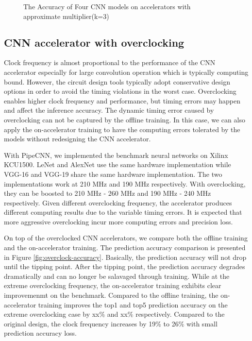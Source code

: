 \begin{figure}
        \center
        \qquad
        \caption{The Accuracy of Four CNN models on accelerators with approximate multiplier(k=3)}
        \label{fig:k3-approximate-mltiplier}
\end{figure}

\subsection{CNN accelerator with overclocking}
Clock frequency is almost proportional to the performance of the CNN accelerator 
especially for large convolution operation which is typically computing bound. 
However, the circuit design tools typically adopt conservative design options 
in order to avoid the timing violations in the worst case. Overclocking enables 
higher clock frequency and performance, but timing errors may happen and affect 
the inference accuracy. The dynamic timing error caused by overclocking 
can not be captured by the offline training. In this case, we can also apply the on-accelerator 
training to have the computing errors tolerated by the models without 
redesigning the CNN accelerator.

With PipeCNN, we implemented the benchmark neural networks on Xilinx KCU1500. 
LeNet and AlexNet use the same hardware implementation 
while VGG-16 and VGG-19 share the same hardware implementation. 
The two implementations work at 210 MHz and 190 MHz respectively.
With overclocking, they can be boosted to 210 MHz - 260 MHz and 
190 MHz - 240 MHz respectively. Given different overclocking frequency, 
the accelerator produces different computing results due to the variable
timing errors. It is expected that more aggressive overclocking incur 
more computing errors and precision loss. 

On top of the overclocked CNN accelerators, we compare both the offline training and the on-accelerator training.
The prediction accuracy comparison is presented in Figure \ref{fig:overclock-accuracy}. 
Basically, the prediction accuracy will not drop until the tipping point. After the tipping point, the 
prediction accuracy degrades dramatically and can no longer be salavaged through training.
While at the extreme overclocking frequency, the on-accelerator training exhibits clear 
improvemenmt on the benchmark. Compared to the offline training, 
the on-accelerator training improves the top1 and top5 prediction accuracy 
on the extreme overclocking case by xx\% and xx\% respectively.
Compared to the original design, the clock frequency 
increases by 19\% to 26\% with small prediction accuracy loss. 

